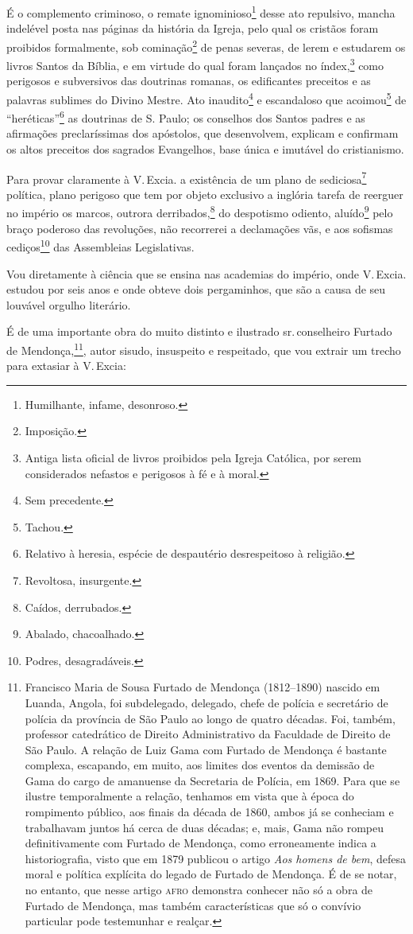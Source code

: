 É o complemento criminoso, o remate ignominioso\footnote{Humilhante,
  infame, desonroso.} desse ato repulsivo, mancha indelével posta nas
páginas da história da Igreja, pelo qual os cristãos foram proibidos
formalmente, sob cominação\footnote{Imposição.} de penas severas, de
lerem e estudarem os livros Santos da Bíblia, e em virtude do qual foram
lançados no índex,\footnote{Antiga lista oficial de livros proibidos
  pela Igreja Católica, por serem considerados nefastos e perigosos à fé
  e à moral.} como perigosos e subversivos das doutrinas romanas, os
edificantes preceitos e as palavras sublimes do Divino Mestre. Ato
inaudito\footnote{Sem precedente.} e escandaloso que
acoimou\footnote{Tachou.} de ``heréticas''\footnote{Relativo à heresia,
  espécie de despautério desrespeitoso à religião.} as doutrinas de S.
Paulo; os conselhos dos Santos padres e as afirmações preclaríssimas dos
apóstolos, que desenvolvem, explicam e confirmam os altos preceitos dos
sagrados Evangelhos, base única e imutável do cristianismo.

Para provar claramente à V.\,Excia. a existência de um plano de
sediciosa\footnote{Revoltosa, insurgente.} política, plano perigoso
que tem por objeto exclusivo a inglória tarefa de reerguer no império os
marcos, outrora derribados,\footnote{Caídos, derrubados.} do
despotismo odiento, aluído\footnote{Abalado, chacoalhado.} pelo braço
poderoso das revoluções, não recorrerei a declamações vãs, e aos
sofismas cediços\footnote{Podres, desagradáveis.} das Assembleias
Legislativas.

Vou diretamente à ciência que se ensina nas academias do império, onde
V.\,Excia. estudou por seis anos e onde obteve dois pergaminhos, que são
a causa de seu louvável orgulho literário.

É de uma importante obra do muito distinto e ilustrado sr.\,conselheiro
Furtado de Mendonça,\footnote{Francisco Maria de Sousa Furtado de
  Mendonça (1812--1890) nascido em Luanda, Angola, foi subdelegado,
  delegado, chefe de polícia e secretário de polícia da província de São
  Paulo ao longo de quatro décadas. Foi, também, professor catedrático
  de Direito Administrativo da Faculdade de Direito de São Paulo. A
  relação de Luiz Gama com Furtado de Mendonça é bastante complexa,
  escapando, em muito, aos limites dos eventos da demissão de Gama do
  cargo de amanuense da Secretaria de Polícia, em 1869. Para que se
  ilustre temporalmente a relação, tenhamos em vista que à época do
  rompimento público, aos finais da década de 1860, ambos já se
  conheciam e trabalhavam juntos há cerca de duas décadas; e, mais, Gama
  não rompeu definitivamente com Furtado de Mendonça, como erroneamente
  indica a historiografia, visto que em 1879 publicou o artigo \emph{Aos
  homens de bem}, defesa moral e política explícita do legado de Furtado
  de Mendonça. É de se notar, no entanto, que nesse artigo \textsc{afro}
  demonstra conhecer não só a obra de Furtado de Mendonça, mas também
  características que só o convívio particular pode testemunhar e
  realçar.}, autor sisudo, insuspeito e respeitado, que vou extrair um
trecho para extasiar à V.\,Excia:

